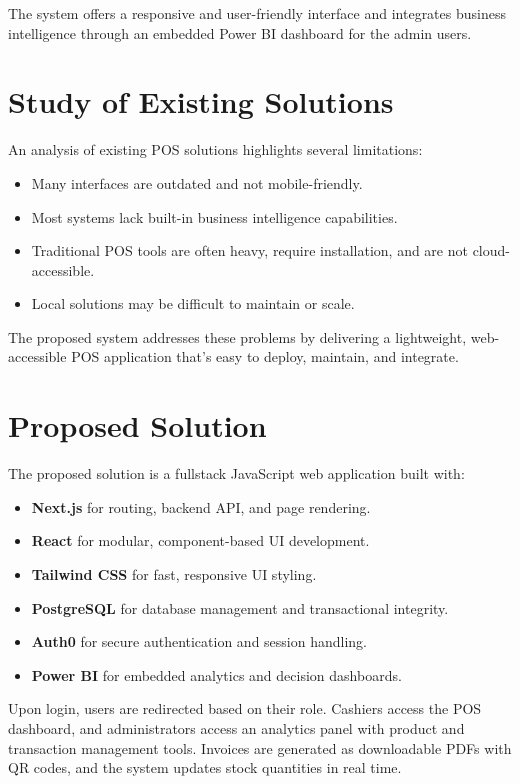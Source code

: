 The system offers a responsive and user-friendly interface and integrates business intelligence through an embedded Power BI dashboard for the admin users.

\section{Study of Existing Solutions}

An analysis of existing POS solutions highlights several limitations:
\begin{itemize}
  \item Many interfaces are outdated and not mobile-friendly.
  \item Most systems lack built-in business intelligence capabilities.
  \item Traditional POS tools are often heavy, require installation, and are not cloud-accessible.
  \item Local solutions may be difficult to maintain or scale.
\end{itemize}

The proposed system addresses these problems by delivering a lightweight, web-accessible POS application that’s easy to deploy, maintain, and integrate.

\section{Proposed Solution}

The proposed solution is a fullstack JavaScript web application built with:
\begin{itemize}
  \item \textbf{Next.js} for routing, backend API, and page rendering.
  \item \textbf{React} for modular, component-based UI development.
  \item \textbf{Tailwind CSS} for fast, responsive UI styling.
  \item \textbf{PostgreSQL} for database management and transactional integrity.
  \item \textbf{Auth0} for secure authentication and session handling.
  \item \textbf{Power BI} for embedded analytics and decision dashboards.
\end{itemize}

Upon login, users are redirected based on their role. Cashiers access the POS dashboard, and administrators access an analytics panel with product and transaction management tools. Invoices are generated as downloadable PDFs with QR codes, and the system updates stock quantities in real time.

